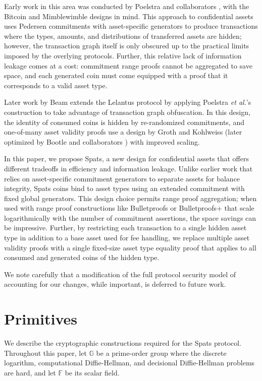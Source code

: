 \documentclass{article}
\newcommand{\G}{\mathbb{G}}
\newcommand{\F}{\mathbb{F}}
\begin{document}
Early work in this area was conducted by Poelstra and collaborators \cite{poelstra}, with the Bitcoin and Mimblewimble designs in mind.
This approach to confidential assets uses Pedersen commitments with asset-specific generators to produce transactions where the types, amounts, and distributions of transferred assets are hidden; however, the transaction graph itself is only obscured up to the practical limits imposed by the overlying protocols.
Further, this relative lack of information leakage comes at a cost: commitment range proofs cannot be aggregated to save space, and each generated coin must come equipped with a proof that it corresponds to a valid asset type.

Later work by Beam \cite{lelantus_cla} extends the Lelantus protocol by applying Poelstra \textit{et al.}'s construction to take advantage of transaction graph obfuscation.
In this design, the identity of consumed coins is hidden by re-randomized commitments, and one-of-many asset validity proofs use a design by Groth and Kohlweiss \cite{groth} (later optimized by Bootle and collaborators \cite{bootle}) with improved scaling.

In this paper, we propose Spats, a new design for confidential assets that offers different tradeoffs in efficiency and information leakage.
Unlike earlier work that relies on asset-specific commitment generators to separate assets for balance integrity, Spats coins bind to asset types using an extended commitment with fixed global generators.
This design choice permits range proof aggregation; when used with range proof constructions like Bulletproofs \cite{bp} or Bulletproofs+ \cite{bp_plus} that scale logarithmically with the number of commitment assertions, the space savings can be impressive.
Further, by restricting each transaction to a single hidden asset type in addition to a base asset used for fee handling, we replace multiple asset validity proofs with a single fixed-size asset type equality proof that applies to all consumed and generated coins of the hidden type.

We note carefully that a modification of the full protocol security model of \cite{spark} accounting for our changes, while important, is deferred to future work.


\section{Primitives}

We describe the cryptographic constructions required for the Spats protocol.
Throughout this paper, let $\G$ be a prime-order group where the discrete logarithm, computational Diffie-Hellman, and decisional Diffie-Hellman problems are hard, and let $\F$ be its scalar field.
\end{document}
